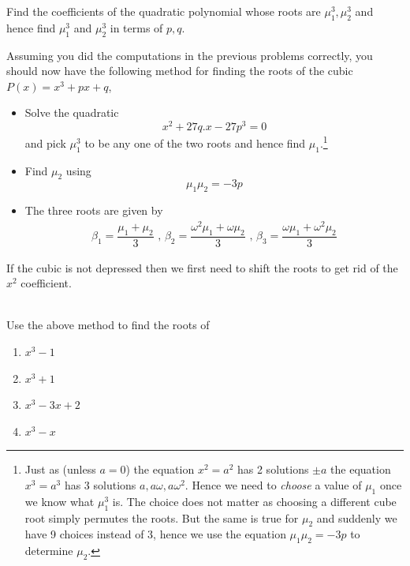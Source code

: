 \begin{questions}[resume]
\item Find the coefficients of the quadratic polynomial whose roots are $\mu_1^3, \mu_2^3$ and hence find $ \mu_1^3$ and $ \mu_2^3$ in terms of $ p,q$.
\end{questions}


\newpage

Assuming you did the computations in the previous problems correctly, you should now have the following method for finding the roots of the cubic $P(x) = x^3 + px + q$,
  \begin{itemize}
    \item Solve the quadratic $$x^2 + 27q .x - 27 p^3 = 0$$ and pick $ \mu_1^3$ to be any one of the two roots and hence find $ \mu_1$.\footnote{Just as (unless $ a=0$) the equation $ x^2=a^2 $ has 2 solutions $ \pm a$ the equation $ x^3=a^3 $ has 3 solutions $ a, a \omega, a \omega^2$. 
    Hence we need to \emph{choose} a value of $ \mu_1$ once we know what $ \mu_1^3$ is. 
    The choice does not matter as choosing a different cube root simply permutes the roots. But the same is true for $ \mu_2$ and suddenly we have 9 choices instead of 3, hence we use the equation $ \mu_1 \mu_2 = -3p$ to determine $ \mu_2$.}
    \item Find $ \mu_2$ using $$ \mu_1 \mu_2 = -3p$$
    \item The three roots are given by
      \begin{align*}
        \beta_1 = \dfrac{\mu_1 + \mu_2}{3} 
        \mbox { , } \beta_2 = \dfrac{\omega^2 \mu_1 + \omega \mu_2}{3}
        \mbox { , } \beta_3 = \dfrac{\omega \mu_1 + \omega^2 \mu_2}{3}
      \end{align*}
  \end{itemize}
If the cubic is not depressed then we first need to shift the roots to get rid of the $ x^2$ coefficient.\\\\

\begin{questions}[resume]
  \item Use the above method to find the roots of 
    \begin{enumerate}
      \item $ x^3 - 1$
      \item $ x^3 + 1$
      \item $ x^3 - 3x + 2$
      \item $ x^3 - x$
    \end{enumerate} 
\end{questions}

